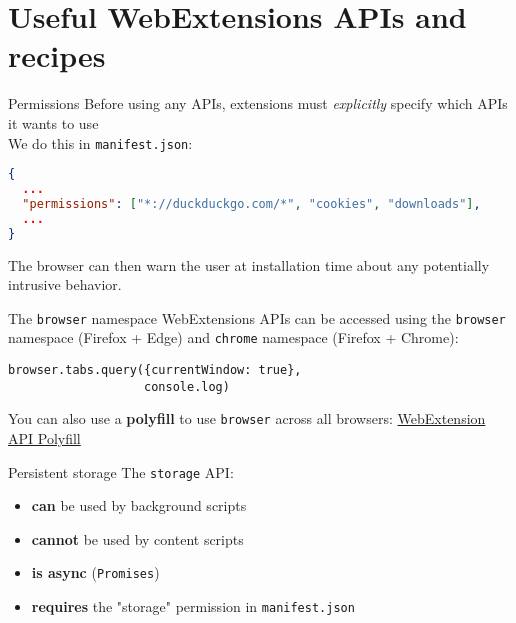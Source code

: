 \documentclass[../index.tex]{subfiles}
\begin{document}

\renewcommand{\sectiontitle}{Useful WebExtensions APIs and recipes}
\section{\sectiontitle}


\renewcommand{\currenttitle}{Permissions}
\begin{frame}[fragile]{\currenttitle}
  Before using any APIs, extensions must \textit{explicitly} specify which APIs
  it wants to use \\[1em]

  We do this in \texttt{manifest.json}:
  \begin{lstlisting}[language=json]
{
  ...
  "permissions": ["*://duckduckgo.com/*", "cookies", "downloads"],
  ...
}
  \end{lstlisting}

  \vspace*{1em}
  The browser can then warn the user at installation time about any potentially
  intrusive behavior.
\end{frame}


\renewcommand{\currenttitle}{The \texttt{browser} namespace}
\begin{frame}[fragile]{\currenttitle}
  WebExtensions APIs can be accessed using the \texttt{browser} namespace
  (Firefox + Edge) and \texttt{chrome} namespace (Firefox + Chrome): \\[1em]

  \begin{lstlisting}[language=ES6,basicstyle=\ttfamily\small]
browser.tabs.query({currentWindow: true},
                   console.log)
  \end{lstlisting}

  \vspace*{2em}

  You can also use a \textbf{polyfill} to use \texttt{browser} across all
  browsers:
  \href{https://github.com/mozilla/webextension-polyfill}
       {WebExtension API Polyfill}
\end{frame}

\renewcommand{\currenttitle}{Persistent storage}
\begin{frame}[fragile]{\currenttitle}
  The \texttt{storage} API:

  \begin{itemize}
    \item \textbf{can} be used by background scripts
    \item \textbf{cannot} be used by content scripts
    \item \textbf{is async} (\texttt{Promises})
    \item \textbf{requires} the "storage" permission in \texttt{manifest.json}
  \end{itemize}
\end{frame}
\end{document}
